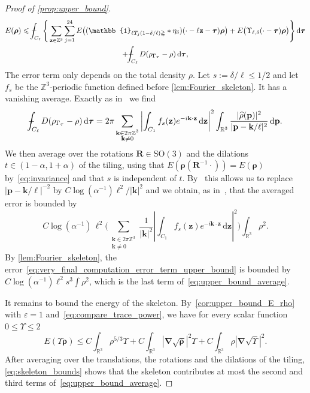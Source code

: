\documentclass[final,reqno]{amsart}
\theoremstyle{remark}
\renewcommand{\le}{\leqslant}
\renewcommand{\epsilon}{\varepsilon}
\newcommand{\wh}[1]{\widehat{#1}}
\newcommand{\RR}{\mathbb{R}}
\newcommand{\ZZ}{\mathbb{Z}}
\newcommand{\SO}{\mathrm{SO}}
\newcommand{\iden}{\mathbb{1}}
\newcommand{\grad}{\bm{\nabla}}
\newcommand{\tetra}{\mathbb{\Delta}}
\newcommand{\dd}{\mathrm{d}}
\def\Xint#1{\mathchoice
{\XXint\displaystyle\textstyle{#1}}
{\XXint\textstyle\scriptstyle{#1}}
{\XXint\scriptstyle\scriptscriptstyle{#1}}
{\XXint\scriptscriptstyle\scriptscriptstyle{#1}}
\!\int}
\def\XXint#1#2#3{{\setbox0=\hbox{$#1{#2#3}{\int}$ }
\vcenter{\hbox{$#2#3$ }}\kern-.6\wd0}}
\def\dashint{\Xint-}
\begin{document}
\begin{proof}[Proof of \cref{prop:upper_bound}]
\begin{multline*}
E(\bm{\rho})\le\dashint_{C_\ell}\Bigg\{\sum_{\mathbf{z}\in\ZZ^3}\sum_{j=1}^{24} E\big((\iden_{\ell T_j(1-\delta/\ell)\tetra}\ast\eta_\delta)(\cdot-\ell \mathbf{z}-\bm{\tau})\bm{\rho}\big)+E\big(\Upsilon_{\ell,\delta}(\cdot-\bm{\tau})\bm{\rho}\big)\Bigg\}\,\dd\bm{\tau}\\
+\dashint_{C_\ell}D(\rho_{\Gamma_{\bm{\tau}}}-\rho)\,\dd\bm{\tau},
\end{multline*}
The error term only depends on the total density $\rho$. Let $s:=\delta/\ell\le1/2$ and let $f_s$ be the $\ZZ^3$-periodic function defined before \cref{lem:Fourier_skeleton}. It has a vanishing average. Exactly as in~\cite[Eq. (41)]{lewin2020local} we find
\begin{equation*}
\dashint_{C_\ell}D(\rho_{\Gamma_{\bm{\tau}}}-\rho)\,\dd\bm{\tau}
=2\pi\sum_{\substack{\mathbf{k}\in 2\pi\ZZ^3\\ \mathbf{k}\neq0}} \left|\int_{C_1}f_{s}(\mathbf{z})e^{-i\mathbf{k}\cdot \mathbf{z}}\,\dd \mathbf{z}\right|^2\int_{\RR^3}\frac{|\wh{\rho}(\mathbf{p})|^2}{|\mathbf{p}-\mathbf{k}/\ell|^2}\,\dd \mathbf{p}.
\end{equation*}
We then average over the rotations $\mathbf{R}\in \SO(3)$ and the dilations $t\in(1-\alpha,1+\alpha)$ of the tiling, using that $E(\bm{\rho}(\mathbf{R}^{-1}\cdot))=E(\bm{\rho})$ by~\cref{eq:invariance} and that $s$ is independent of $t$. By~\cite[Lemma~14]{lewin2020local} this allows us to replace $|\mathbf{p}-\mathbf{k}/\ell|^{-2}$ by $C\log(\alpha^{-1})\ell^2/|\mathbf{k}|^2$ and we obtain, as in~\cite[Eq. (43)]{lewin2020local}, that the averaged error is bounded by
\begin{equation}\label{eq:very_final_computation_error_term_upper_bound}
C\log(\alpha^{-1})\,\ell^2\Bigg(\sum_{\substack{\mathbf{k}\in 2\pi\ZZ^3\\ \mathbf{k}\neq0}}\frac{1}{|\mathbf{k}|^2}\left|\int_{C_1}f_{s}(\mathbf{z})e^{-i\mathbf{k}\cdot \mathbf{z}}\,\dd \mathbf{z}\right|^2\Bigg)\int_{\RR^3}\rho^2.
\end{equation}
By \cref{lem:Fourier_skeleton}, the error~\cref{eq:very_final_computation_error_term_upper_bound} is bounded by $C\log(\alpha^{-1})\ell^2s^3\int\rho^2$, which is the last term of~\cref{eq:upper_bound_average}.

It remains to bound the energy of the skeleton. By~\cref{cor:upper_bound_E_rho} with $\epsilon=1$ and~\cref{eq:compare_trace_power}, we have for every scalar function $0\le\Upsilon\le2$
$$
E(\Upsilon \bm{\rho})\le C\int_{\RR^3}\rho^{5/3}\Upsilon+C\int_{\RR^3}|\grad\sqrt{\bm{\rho}}|^2\Upsilon+C\int_{\RR^3}\rho|\grad\sqrt\Upsilon|^2.
$$
After averaging over the translations, the rotations and the dilations of the tiling, \cref{eq:skeleton_bounds} shows that the skeleton contributes at most the second and third terms of~\cref{eq:upper_bound_average}.
\end{proof}
\end{document}

